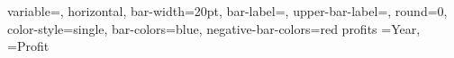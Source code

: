 \documentclass[12pt]{article}
\begin{document}
\DTLbarchart
{
 variable=\theProfit,
 horizontal,
 bar-width=20pt, 
 bar-label={\theYear}, 
 upper-bar-label={\DTLbarvalue}, 
 round=0,
 color-style=single,
 bar-colors={blue},
 negative-bar-colors={red}
}
{profits}%
 {%
 \theYear=Year,
 \theProfit=Profit
} 
\end{document}
